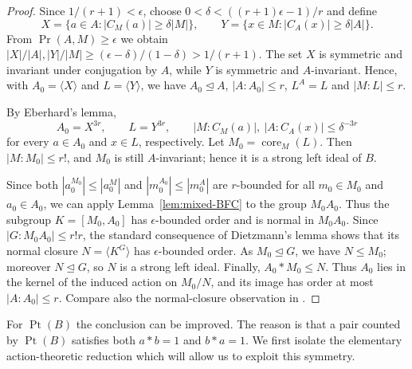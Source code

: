 \documentclass[11pt, oneside]{amsart}
\numberwithin{equation}{section}
\theoremstyle{plain}
\theoremstyle{definition}
\newcommand{\Pt}{\operatorname{Pt} }
\renewcommand{\Pr}{\operatorname{Pr} }
\begin{document}
\begin{proof}
Since $1/(r+1)<\epsilon$, choose
$0<\delta<((r+1)\epsilon-1)/r$ and define
$$
X=\{a\in A:|C_M(a)|\geqslant\delta|M|\},
\qquad
Y=\{x\in M:|C_A(x)|\geqslant\delta|A|\}.
$$
From $\Pr(A,M)\geqslant\epsilon$ we obtain
$|X|/|A|,|Y|/|M|\geqslant(\epsilon-\delta)/(1-\delta)>1/(r+1)$.
The set $X$ is symmetric and invariant under conjugation by $A$, while
$Y$ is symmetric and $A$-invariant. Hence, with
$A_0=\langle X\rangle$ and $L=\langle Y\rangle$, we have
$A_0\unlhd A$, $|A:A_0|\leqslant r$, $L^A=L$ and $|M:L|\leqslant r$.

By Eberhard's lemma,
$$
A_0=X^{3r},\qquad L=Y^{3r},\qquad
|M:C_M(a)|,\ |A:C_A(x)|\leqslant\delta^{-3r}
$$
for every $a\in A_0$ and $x\in L$, respectively. Let
$M_0=\operatorname{core}_M(L)$. Then
$|M:M_0|\leqslant r!$, and $M_0$ is still $A$-invariant; hence it is a
strong left ideal of $B$.

Since both $|a_0^{M_0}| \le |a_0^M|$ and $|m_0^{A_0}| \le |m_0^A|$ are $r$-bounded  for all $m_0 \in M_0$ and $a_0 \in A_0$, we can apply Lemma~\ref{lem:mixed-BFC} to the group $M_0A_0$. Thus the subgroup
$K=[M_0,A_0]$ has $\epsilon$-bounded order and is normal in
$M_0A_0$. Since
$|G:M_0A_0|\leqslant r!r$, the standard consequence of Dietzmann's
lemma shows that its normal closure
$N=\langle K^G\rangle$
has $\epsilon$-bounded order. As $M_0\unlhd G$, we have $N\leqslant
M_0$; moreover $N\unlhd G$, so $N$ is a strong left ideal. Finally,
$A_0*M_0\leqslant N$. Thus $A_0$ lies in the kernel of the induced
action on $M_0/N$, and its image has order at most $|A:A_0|\leqslant r$.
Compare also the normal-closure observation in
\cite[Remark 2.6]{DS22}.
\end{proof}

For $\Pt(B)$ the conclusion can be improved. The reason is that a pair
counted by $\Pt(B)$ satisfies both $a*b=1$ and $b*a=1$. We first isolate
the elementary action-theoretic reduction which will allow us to exploit
this symmetry.
\end{document}
